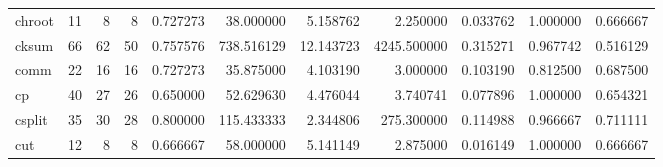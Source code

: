\begin{tabular}{lrrrrrrrrrr}
chroot    &                                      11 &                  8 &                                 8 &                                   0.727273 &                              38.000000 &                                     5.158762 &                          2.250000 &                                0.033762 &                           1.000000 &                                           0.666667 \\
cksum     &                                      66 &                 62 &                                50 &                                   0.757576 &                             738.516129 &                                    12.143723 &                       4245.500000 &                                0.315271 &                           0.967742 &                                           0.516129 \\
comm      &                                      22 &                 16 &                                16 &                                   0.727273 &                              35.875000 &                                     4.103190 &                          3.000000 &                                0.103190 &                           0.812500 &                                           0.687500 \\
cp        &                                      40 &                 27 &                                26 &                                   0.650000 &                              52.629630 &                                     4.476044 &                          3.740741 &                                0.077896 &                           1.000000 &                                           0.654321 \\
csplit    &                                      35 &                 30 &                                28 &                                   0.800000 &                             115.433333 &                                     2.344806 &                        275.300000 &                                0.114988 &                           0.966667 &                                           0.711111 \\
cut       &                                      12 &                  8 &                                 8 &                                   0.666667 &                              58.000000 &                                     5.141149 &                          2.875000 &                                0.016149 &                           1.000000 &                                           0.666667 \\

\end{tabular}
